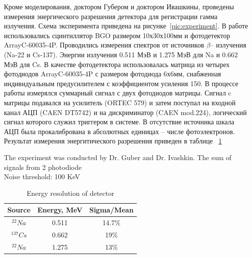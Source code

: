 \documentclass[a4paper]{panl}
\begin{document}
Кроме моделирования, доктором Губером и доктором Ивашкины, проведены измерения энергического разрешения детектора  для регистрации гамма излучения. Схема эксперимента приведена на рисунке~\ref{pic:experiment}. В работе использовались сцинтиллятор BGO размером 10х30х100мм и фотодетектор ArrayC-60035-4P. Проводились измерения спектров от источников $\beta$– излучения (Na-22 и Cs-137). Энергии излучения 0.511 МэВ и 1.275 МэВ для Na и 0.662 МэВ для Cs. В качестве фотодетектора использовалась матрица из четырех фотодиодов ArrayC-60035-4P с размером фотодиода 6х6мм, снабженная индивидуальным предусилителем с коэффициентом усиления 150. В процессе работы измерялся суммарный сигнал с двух фотодиодов матрицы. Сигнал c матрицы подавался на усилитель (ORTEC 579) и затем поступал на входной канал АЦП (CAEN DT5742) и на дискриминатор (CAEN mod.224), логический сигнал которого служил триггером в системе. В отсутствие источника шкала АЦП была прокалибрована в абсолютных единицах – числе фотоэлектронов. Результат измерения энергитического разрешения приведен в таблице ~\ref{tab:ex}

The experiment was conducted by Dr. Guber and Dr. Ivashkin.
The sum of signals from 2 photodiode\\
Noise threshold: 100 KeV\\
\begin{table}
    \begin{center} 
        \begin{tabular}[c]{|c|c|c|}
            
            \hline 
            Source & Energy, MeV & Sigma/Mean \\
            \hline 
            $^{22}Na$&0.511 & 14.7\%  \\ 
            \hline 
            $^{137}Cs$&0.662 & 19\%\\ 
            \hline 
            $^{22}Na$& 1.275 & 13\% \\
            \hline 
        \end{tabular} 
    \end{center}
\caption{Energy resolution of detector}
\label{tab:ex}
\end{table}
\end{document}
